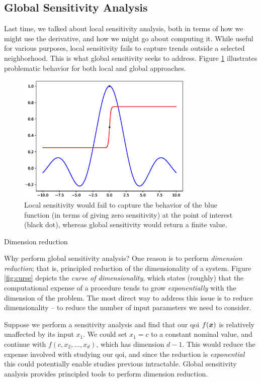 \documentclass[../primer.tex]{subfiles}
\begin{document}
\subsection{Global Sensitivity Analysis}
\label{sec:org81b0ac8}
Last time, we talked about local sensitivity analysis, both in terms of how we
might use the derivative, and how we might go about computing it. While useful
for various purposes, local sensitivity fails to capture trends outside a
selected neighborhood. This is what global sensitivity seeks to address. Figure
\ref{fig:ex1} illustrates problematic behavior for both local and global
approaches.

\begin{figure}[!ht]
  \centering\includegraphics[width=0.75\textwidth]{./images/ex1}
  \caption{Local sensitivity would fail to capture the behavior of the blue
  function (in terms of giving zero sensitivity) at the point of interest (black dot),
  whereas global sensitivity would return a finite value.}
  \label{fig:ex1}
\end{figure}

Dimension reduction

Why perform global sensitivity analysis? One reason is to perform \emph{dimension
reduction}; that is, principled reduction of the dimensionality of a system.
Figure \ref{fig:curse} depicts the \emph{curse of dimensionality}, which states
(roughly) that the computational expense of a procedure tends to grow
\emph{exponentially} with the dimension of the problem. The most direct way to
address this issue is to reduce dimensionality -- to reduce the number of input
parameters we need to consider.

Suppose we perform a sensitivity analysis and find that our qoi \(f(\boldsymbol{x})\) is
relatively unaffected by its input \(x_1\). We could set \(x_1=c\) to a constant
nominal value, and continue with \(f(c,x_2,\dots,x_d)\), which has dimension
\(d-1\). This would reduce the expense involved with studying our qoi, and since
the reduction is \emph{exponential} this could potentially enable studies previous
intractable. Global sensitivity analysis provides principled tools to perform
dimension reduction.
\end{document}
